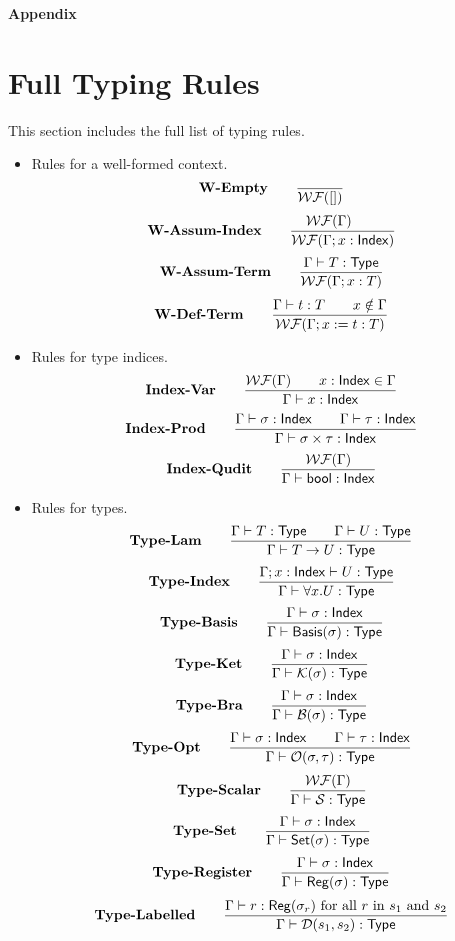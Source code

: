 \begin{center} {\Large \textbf{Appendix}} \end{center}

\section{Full Typing Rules}

\label{sec: full typing rules}

This section includes the full list of typing rules.

\begin{itemize}
    \item Rules for a well-formed context.
    \[
        \textbf{W-Empty} \qquad
        \frac{}{\mathcal{WF}([])}
    \]
    \[
        \textbf{W-Assum-Index} \qquad
        \frac{\mathcal{WF}(\Gamma) \qquad}{\mathcal{WF}(\Gamma; x : \mathsf{Index})}
    \]
    \[
        \textbf{W-Assum-Term} \qquad
        \frac{\Gamma \vdash T : \mathsf{Type}}{\mathcal{WF}(\Gamma; x:T)}
    \]
    \[
        \textbf{W-Def-Term} \qquad
        \frac{\Gamma \vdash t:T \qquad x \notin \Gamma}{\mathcal{WF}(\Gamma; x:=t:T)}
    \]

    \item Rules for type indices.
    \[
        \textbf{Index-Var} \qquad
        \frac{\mathcal{WF}(\Gamma) \qquad x : \mathsf{Index} \in \Gamma}{\Gamma \vdash x : \mathsf{Index}}
    \]
    \[
        \textbf{Index-Prod} \qquad
        \frac{\Gamma \vdash \sigma : \mathsf{Index} \qquad \Gamma \vdash \tau : \mathsf{Index}}{\Gamma \vdash \sigma \times \tau : \mathsf{Index}}
    \]
    \[
        \textbf{Index-Qudit} \qquad
        \frac{\mathcal{WF}(\Gamma)}{\Gamma \vdash \mathsf{bool} : \mathsf{Index}}
    \]


    \item Rules for types.
    \[
        \textbf{Type-Lam} \qquad
        \frac{\Gamma \vdash T : \mathsf{Type} \qquad \Gamma \vdash U : \mathsf{Type}}{\Gamma \vdash T \to U : \mathsf{Type}}
    \]
    \[
        \textbf{Type-Index} \qquad
        \frac{\Gamma; x : \mathsf{Index} \vdash U : \mathsf{Type}}{\Gamma \vdash \forall x.U : \mathsf{Type}}
    \]
    \[
        \textbf{Type-Basis} \qquad
        \frac{\Gamma \vdash \sigma : \mathsf{Index}}{\Gamma \vdash \mathsf{Basis}(\sigma) : \mathsf{Type}}
    \]
    \[
        \textbf{Type-Ket} \qquad
        \frac{\Gamma \vdash \sigma : \mathsf{Index}}{\Gamma \vdash \mathcal{K}(\sigma) : \mathsf{Type}}
    \]
    \[
        \textbf{Type-Bra} \qquad
        \frac{\Gamma \vdash \sigma : \mathsf{Index}}{\Gamma \vdash \mathcal{B}(\sigma) : \mathsf{Type}}
    \]
    \[
        \textbf{Type-Opt} \qquad
        \frac{\Gamma \vdash \sigma : \mathsf{Index} \qquad \Gamma \vdash \tau : \mathsf{Index}}{\Gamma \vdash \mathcal{O}(\sigma, \tau) : \mathsf{Type}}
    \]
    \[
        \textbf{Type-Scalar} \qquad
        \frac{\mathcal{WF}(\Gamma)}{\Gamma \vdash \mathcal{S} : \mathsf{Type}}
    \]
    \[
        \textbf{Type-Set} \qquad
        \frac{\Gamma \vdash \sigma : \mathsf{Index}}{\Gamma \vdash \mathsf{Set}(\sigma) : \mathsf{Type}}
    \]
    \[
        \textbf{Type-Register} \qquad
        \frac{\Gamma \vdash  \sigma : \mathsf{Index}}{\Gamma \vdash \mathsf{Reg}(\sigma) : \mathsf{Type}}
    \]
    \[
        \textbf{Type-Labelled} \qquad
        \frac{\Gamma \vdash r : \mathsf{Reg}(\sigma_r) \text{ for all $r$ in $s_1$ and $s_2$} }{\Gamma \vdash \mathcal{D}(s_1, s_2) : \textsf{Type}} 
    \]


\end{itemize}
